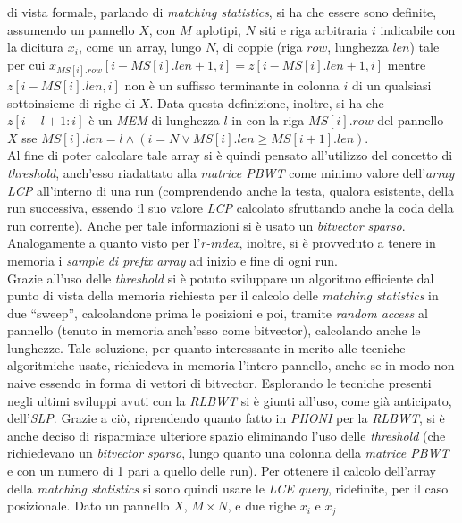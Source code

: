 \documentclass[a4paper,11pt, oneside]{article}
\begin{document}
di vista formale, parlando di \textit{matching statistics}, si ha che essere
sono definite, assumendo un pannello $X$, con $M$ aplotipi, $N$ siti e riga
arbitraria $i$ indicabile con la dicitura $x_i$, come un array, lungo $N$, di
coppie (riga $row$, lunghezza $len$) tale per cui
$x_{MS[i].row}[i-MS[i].len+1,i]=z[i-MS[i].len+1,i]$ mentre $z[i-MS[i].len,i]$
non è un suffisso terminante in colonna $i$ di un qualsiasi sottoinsieme di
righe di $X$. Data questa definizione, inoltre, si ha che $z[i-l+1:i]$
è un \textit{MEM} di lunghezza $l$ in con la riga $MS[i].row$ del pannello
$X$ sse $MS[i].len=l\land(i=N\lor MS[i].len\geq MS[i+1].len)$.\\
Al fine di poter calcolare tale array si è quindi pensato all'utilizzo del
concetto di \textit{threshold}, anch'esso riadattato alla \textit{matrice PBWT}
come minimo valore dell'\textit{array LCP} all'interno di una run (comprendendo
anche la testa, qualora esistente, della run successiva, essendo il suo valore
\textit{LCP} calcolato sfruttando anche la coda della run corrente). Anche per
tale informazioni si è usato un \textit{bitvector sparso}.\\
Analogamente a quanto visto per l'\textit{r-index}, inoltre, si è provveduto a
tenere in memoria i \textit{sample di prefix array} ad inizio e fine di ogni
run.\\ 
Grazie all'uso delle \textit{threshold} si è potuto sviluppare un algoritmo
efficiente dal punto di vista della memoria richiesta per il calcolo delle
\textit{matching statistics} in due ``sweep'', calcolandone prima le posizioni e
poi, tramite \textit{random access} al pannello (tenuto in memoria anch'esso
come bitvector), calcolando anche le lunghezze. Tale soluzione, per quanto
interessante in merito alle tecniche algoritmiche usate, richiedeva in memoria
l'intero pannello, anche se in modo non naive essendo in forma di vettori di
bitvector. Esplorando le tecniche presenti negli ultimi sviluppi avuti con la
\textit{RLBWT} si è giunti all'uso, come già anticipato,
dell'\textit{SLP}. Grazie a ciò, riprendendo quanto fatto in \textit{PHONI} per
la \textit{RLBWT}, si è anche deciso di risparmiare ulteriore spazio eliminando
l'uso delle \textit{threshold} (che richiedevano un \textit{bitvector sparso},
lungo quanto una colonna della \textit{matrice PBWT} e con un numero di 1 pari a
quello delle run). Per ottenere il calcolo dell'array della \textit{matching
  statistics} si sono quindi usare le \textit{LCE query}, ridefinite, per il
caso posizionale. Dato un pannello $X$, $M\times N$, e due righe $x_i$ e $x_j$
\end{document}
